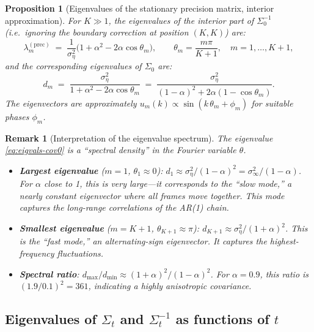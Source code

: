 \documentclass[11pt,a4paper]{article}
\newtheorem{proposition}[theorem]{Proposition}
\newtheorem{remark}[theorem]{Remark}
\newcommand{\sigeta}{\sigma_\eta^2}
\newcommand{\siginf}{\sigma_\infty^2}
\begin{document}
\begin{proposition}[Eigenvalues of the stationary precision matrix, interior approximation]\label{prop:eigvals-approx}
For $K \gg 1$, the eigenvalues of the interior part of $\Sigma_0^{-1}$ (i.e.\ ignoring the boundary correction at position $(K,K)$) are:
\begin{equation}\label{eq:eigvals-prec0}
  \lambda_m^{(\mathrm{prec})} \;=\; \frac{1}{\sigeta}\bigl(1 + \alpha^2 - 2\alpha\cos\theta_m\bigr), \qquad \theta_m = \frac{m\pi}{K+1}, \quad m = 1, \dots, K+1,
\end{equation}
and the corresponding eigenvalues of $\Sigma_0$ are:
\begin{equation}\label{eq:eigvals-cov0}
  d_m \;=\; \frac{\sigeta}{1 + \alpha^2 - 2\alpha\cos\theta_m} \;=\; \frac{\sigeta}{(1 - \alpha)^2 + 2\alpha(1 - \cos\theta_m)}.
\end{equation}
The eigenvectors are approximately $u_m(k) \propto \sin(k\,\theta_m + \phi_m)$ for suitable phases $\phi_m$.
\end{proposition}

\begin{remark}[Interpretation of the eigenvalue spectrum]\label{rem:eigenvalue-interpretation}
The eigenvalue \eqref{eq:eigvals-cov0} is a ``spectral density'' in the Fourier variable $\theta$.
\begin{itemize}[nosep]
  \item \textbf{Largest eigenvalue} ($m=1$, $\theta_1 \approx 0$): $d_1 \approx \sigeta / (1-\alpha)^2 = \siginf / (1-\alpha)$.  For $\alpha$ close to 1, this is very large---it corresponds to the ``slow mode,'' a nearly constant eigenvector where all frames move together.  This mode captures the long-range correlations of the AR(1) chain.
  \item \textbf{Smallest eigenvalue} ($m = K+1$, $\theta_{K+1} \approx \pi$): $d_{K+1} \approx \sigeta / (1+\alpha)^2$.  This is the ``fast mode,'' an alternating-sign eigenvector.  It captures the highest-frequency fluctuations.
  \item \textbf{Spectral ratio}: $d_{\max}/d_{\min} \approx (1+\alpha)^2/(1-\alpha)^2$.  For $\alpha = 0.9$, this ratio is $(1.9/0.1)^2 = 361$, indicating a highly anisotropic covariance.
\end{itemize}
\end{remark}

\subsection{Eigenvalues of $\Sigma_t$ and $\Sigma_t^{-1}$ as functions of $t$}
\end{document}
